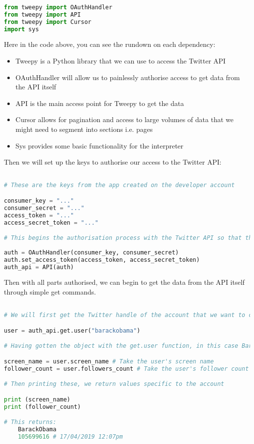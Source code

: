 \documentclass[12pt, letterpaper]{article}
\begin{document}
\begin{lstlisting}[language=python]
		
from tweepy import OAuthHandler
from tweepy import API
from tweepy import Cursor
import sys
\end{lstlisting}


\FloatBarrier
Here in the code above, you can see the rundown on each dependency:
\begin{itemize}
	\item Tweepy is a Python library that we can use to access the Twitter API
	\item OAuthHandler will allow us to painlessly authorise access to get data from the API itself
	\item API is the main access point for Tweepy to get the data
	\item Cursor allows for pagination and access to large volumes of data that we might need to segment into sections i.e. pages
	\item Sys provides some basic functionality for the interpreter
\end{itemize}

Then we will set up the keys to authorise our access to the Twitter API:
	
\begin{lstlisting}[language=python]

# These are the keys from the app created on the developer account

consumer_key = "..." 
consumer_secret = "..."
access_token = "..."
access_secret_token = "..."

# This begins the authorisation process with the Twitter API so that the program can authenticate it self with the website
	
auth = OAuthHandler(consumer_key, consumer_secret)
auth.set_access_token(access_token, access_secret_token)
auth_api = API(auth)
\end{lstlisting}

Then with all parts authorised, we can begin to get the data from the API itself through simple get commands.

\begin{lstlisting}[language=python]

# We will first get the Twitter handle of the account that we want to check out:

user = auth_api.get.user("barackobama")

# Having gotten the object with the get.user function, in this case Barack Obama's account, we can execute some functions on it like:

screen_name = user.screen_name # Take the user's screen name
follower_count = user.followers_count # Take the user's follower count

# Then printing these, we return values specific to the account

print (screen_name)
print (follower_count)

# This returns:
	BarackObama
	105699616 # 17/04/2019 12:07pm

\end{lstlisting}
\end{document}
